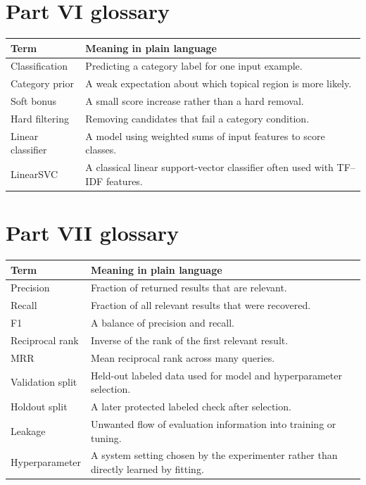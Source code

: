 \documentclass[11pt,oneside]{report}
\begin{document}
\chapter*{Part VI glossary}
\begin{longtable}{p{}p{}}
\toprule
\textbf{Term} & \textbf{Meaning in plain language} \\ \midrule
Classification & Predicting a category label for one input example. \\ \midrule
Category prior & A weak expectation about which topical region is more likely. \\ \midrule
Soft bonus & A small score increase rather than a hard removal. \\ \midrule
Hard filtering & Removing candidates that fail a category condition. \\ \midrule
Linear classifier & A model using weighted sums of input features to score classes. \\ \midrule
LinearSVC & A classical linear support-vector classifier often used with TF--IDF features. \\
\bottomrule
\end{longtable}


\chapter*{Part VII glossary}
\begin{longtable}{p{}p{}}
\toprule
\textbf{Term} & \textbf{Meaning in plain language} \\ \midrule
Precision & Fraction of returned results that are relevant. \\ \midrule
Recall & Fraction of all relevant results that were recovered. \\ \midrule
F1 & A balance of precision and recall. \\ \midrule
Reciprocal rank & Inverse of the rank of the first relevant result. \\ \midrule
MRR & Mean reciprocal rank across many queries. \\ \midrule
Validation split & Held-out labeled data used for model and hyperparameter selection. \\ \midrule
Holdout split & A later protected labeled check after selection. \\ \midrule
Leakage & Unwanted flow of evaluation information into training or tuning. \\ \midrule
Hyperparameter & A system setting chosen by the experimenter rather than directly learned by fitting. \\
\bottomrule
\end{longtable}
\end{document}

